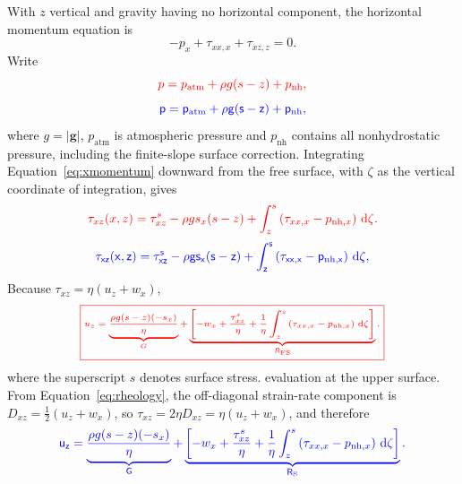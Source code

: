 \documentclass[review]{igs}
\providecommand{\DIFadd}[1]{{\protect\color{blue} \sf #1}} %
\providecommand{\DIFdel}[1]{{\protect\color{red} \scriptsize #1}} %
\providecommand{\DIFaddbegin}{} %
\providecommand{\DIFaddend}{} %
\providecommand{\DIFdelbegin}{} %
\providecommand{\DIFdelend}{} %
\newcommand{\DIFscaledelfig}{0.5}
\newlength{\DIFdelgraphicswidth} %
\newlength{\DIFdelgraphicsheight} %
\newcommand{\DIFaddincludegraphics}[2][]{{\color{blue}\fbox{\DIFOincludegraphics[#1]{#2}}}} %
\newcommand{\DIFdelincludegraphics}[2][]{%
\sbox{\DIFdelgraphicsbox}{\DIFOincludegraphics[#1]{#2}}%
\settoboxwidth{\DIFdelgraphicswidth}{\DIFdelgraphicsbox} %
\settoboxtotalheight{\DIFdelgraphicsheight}{\DIFdelgraphicsbox} %
\scalebox{\DIFscaledelfig}{%
\parbox[b]{\DIFdelgraphicswidth}{\usebox{\DIFdelgraphicsbox}\\[-\baselineskip] \rule{\DIFdelgraphicswidth}{0em}}\llap{\resizebox{\DIFdelgraphicswidth}{\DIFdelgraphicsheight}{%
\setlength{\unitlength}{\DIFdelgraphicswidth}%
\begin{picture}(1,1)%
\thicklines\linethickness{2pt} %
{\color[rgb]{1,0,0}\put(0,0){\framebox(1,1){}}}%
{\color[rgb]{1,0,0}\put(0,0){\line( 1,1){1}}}%
{\color[rgb]{1,0,0}\put(0,1){\line(1,-1){1}}}%
\end{picture}%
}\hspace*{3pt}}} %
} %
\DeclareRobustCommand{\DIFaddbegin}{\DIFOaddbegin \let\includegraphics\DIFaddincludegraphics} %
\DeclareRobustCommand{\DIFaddend}{\DIFOaddend \let\includegraphics\DIFOincludegraphics} %
\DeclareRobustCommand{\DIFdelbegin}{\DIFOdelbegin \let\includegraphics\DIFdelincludegraphics} %
\DeclareRobustCommand{\DIFdelend}{\DIFOaddend \let\includegraphics\DIFOincludegraphics} %
\begin{document}
With \(z\) vertical and gravity having no horizontal component, the horizontal momentum equation is
\begin{equation}
-p_x+\tau_{xx,x}+\tau_{xz,z}=0.
\label{eq:xmomentum}
\end{equation}
Write
\DIFdelbegin \begin{displaymath}
\DIFdel{p=p_{\mathrm{atm}}+\rho g(s-z)+p_{\mathrm{nh}},
}\end{displaymath}%
\DIFdelend \DIFaddbegin \begin{equation}
\DIFadd{p=p_{\mathrm{atm}}+\rho g(s-z)+p_{\mathrm{nh}},
\label{eq:pressuredecomp}
}\end{equation}\DIFaddend 
where \(g=|\bm{g}|\), \(p_{\mathrm{atm}}\) is atmospheric pressure and \(p_{\mathrm{nh}}\) contains all nonhydrostatic pressure, including the finite-slope surface correction. Integrating Equation~\ref{eq:xmomentum} downward from the free surface, with \(\zeta\) as the vertical coordinate of integration, gives
\DIFdelbegin \begin{displaymath}
\DIFdel{\tau_{xz}(x,z)
=\tau_{xz}^{s}
-\rho g s_x(s-z)
+\int_z^s\left(\tau_{xx,x}-p_{\mathrm{nh},x}\right)\,\mathop{}\!\mathrm{d}\zeta.
}\end{displaymath}%
\DIFdelend \DIFaddbegin \begin{equation}
\DIFadd{\tau_{xz}(x,z)
=\tau_{xz}^{s}
-\rho g s_x(s-z)
+\int_z^s\left(\tau_{xx,x}-p_{\mathrm{nh},x}\right)\,\mathop{}\!\mathrm{d}\zeta,
\label{eq:tauxzint}
}\end{equation}\DIFaddend 
\DIFdelbegin \DIFdel{Because \(\tau_{xz}=\eta(u_z+w_x)\),
}\begin{displaymath}
\DIFdel{\boxed{
 u_z
 =\underbrace{\frac{\rho g(s-z)(-s_x)}{\eta}}_{G}
 +\underbrace{
 \left[
 -w_x+\frac{\tau_{xz}^{s}}{\eta}
 +\frac{1}{\eta}\int_z^s
 \left(\tau_{xx,x}-p_{\mathrm{nh},x}\right)\,\mathop{}\!\mathrm{d}\zeta
 \right]}_{R_{\mathrm{FS}}}.
}
}\end{displaymath}%
\DIFdelend where the superscript \(s\) denotes \DIFdelbegin \DIFdel{surface stress. }\DIFdelend \DIFaddbegin \DIFadd{evaluation at the upper surface. From Equation~\ref{eq:rheology}, the off-diagonal strain-rate component is \(D_{xz}=\tfrac12(u_z+w_x)\), so \(\tau_{xz}=2\eta D_{xz}=\eta(u_z+w_x)\), and therefore
}\begin{equation}
 \DIFadd{u_z
 =\underbrace{\frac{\rho g(s-z)(-s_x)}{\eta}}_{G}
 +\underbrace{
 \left[
 -w_x+\frac{\tau_{xz}^{s}}{\eta}
 +\frac{1}{\eta}\int_z^s
 \left(\tau_{xx,x}-p_{\mathrm{nh},x}\right)\,\mathop{}\!\mathrm{d}\zeta
 \right]}_{R_{\mathrm{S}}}.
\label{eq:uzdecomp}
}\end{equation}
\end{document}
